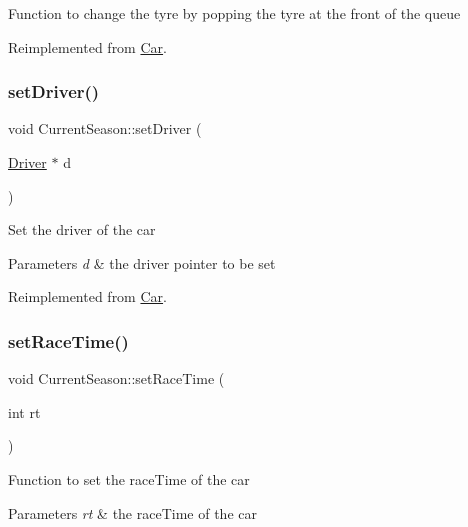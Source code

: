 Function to change the tyre by popping the tyre at the front of the queue 

Reimplemented from \hyperlink{classCar_a5859a9475be0c26341ca4f3acf23a2ea}{Car}.

\mbox{\label{classCurrentSeason_a3ea9de8713c6d2c21202351b036af75f}} 
\subsubsection{\texorpdfstring{set\+Driver()}{setDriver()}}
{\footnotesize\ttfamily void Current\+Season\+::set\+Driver (\begin{DoxyParamCaption}\item[{\hyperlink{classDriver}{Driver} $\ast$}]{d }\end{DoxyParamCaption})\hspace{0.3cm}{\ttfamily [virtual]}}

Set the driver of the car 
\begin{DoxyParams}{Parameters}
{\em d} & the driver pointer to be set \\
\hline
\end{DoxyParams}


Reimplemented from \hyperlink{classCar_ad7148bd1abe107ce2e2b134f78582c9d}{Car}.

\mbox{\label{classCurrentSeason_aae01cbd64006ce4fe60ea337b4f02962}} 
\subsubsection{\texorpdfstring{set\+Race\+Time()}{setRaceTime()}}
{\footnotesize\ttfamily void Current\+Season\+::set\+Race\+Time (\begin{DoxyParamCaption}\item[{int}]{rt }\end{DoxyParamCaption})\hspace{0.3cm}{\ttfamily [virtual]}}

Function to set the race\+Time of the car 
\begin{DoxyParams}{Parameters}
{\em rt} & the race\+Time of the car \\
\hline
\end{DoxyParams}


